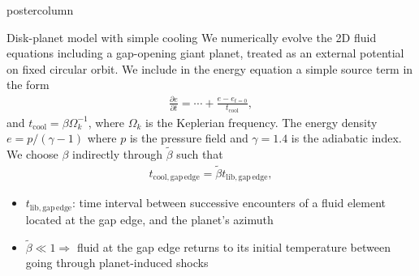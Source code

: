 \documentclass[final,hyperref={pdfpagelabels=false}]{beamer}
\begin{document}
\begin{frame}
\begin{columns}
\begin{column}{.49\textwidth}
\begin{beamercolorbox}[center,wd=\textwidth]{postercolumn}
\begin{minipage}[T]{.95\textwidth}
{            \begin{block}{{\Large Disk-planet model with simple
                  cooling}}
              \justifying
             We numerically evolve the 2D fluid equations including a
             gap-opening giant planet, treated as an external
             potential on fixed circular orbit. We include in the
             energy equation  
        a simple source term in the form 
	\begin{align*}
	\frac{\partial e}{\partial t} = \cdots + \frac{e-e_{t=0}}{t_\mathrm{cool}},
	\end{align*}
        and $t_\mathrm{cool} = \beta \Omega_k^{-1}$, where $\Omega_k$
        is the Keplerian frequency. The energy density
        $e=p/(\gamma-1)$ where $p$ is the pressure field and
        $\gamma=1.4$ is the adiabatic index. We choose $\beta$ indirectly 
        through $\tilde{\beta}$ such that
        \begin{align*}
        t_\mathrm{cool, gap\,edge} = \tilde{\beta} t_\mathrm{lib, gap\,edge},
        \end{align*}
\vspace{-1.8cm}
        \begin{itemize}
        \item  $t_\mathrm{lib, gap\,edge}$: time interval between
          successive encounters of a fluid element located at the gap
          edge, and the planet's azimuth
        \item $\tilde{\beta}\ll 1 \Rightarrow$ fluid at the gap edge returns to its initial temperature
          between going through planet-induced shocks 
        \end{itemize}
        \end{block}
        \vfill

}
\end{minipage}
\end{beamercolorbox}
\end{column}
\end{columns}
\end{frame}
\end{document}
